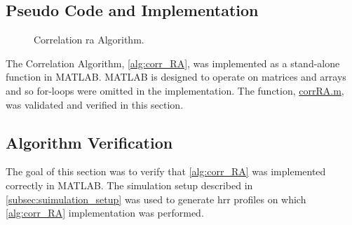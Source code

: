 \documentclass[class=report,11pt,crop=false]{standalone}
\begin{document}
    \subsection{Pseudo Code and Implementation}
    \begin{figure}[ht]
      \vspace{0.5cm}
      \centering
      \captionsetup{type=figure}
      \begin{minipage}{.7\linewidth}
        \begin{algorithm}[h]
            \caption{Correlation \gls{ra} Algorithm.\label{alg:corr_RA}}
            
            \LinesNumbered %
            \DontPrintSemicolon
            \SetAlgoLined
    
            
            \BlankLine
          \vspace{0.5cm}
        \end{algorithm}
      \end{minipage}
    \end{figure}

    The Correlation Algorithm, \autoref{alg:corr_RA}, was implemented as a stand-alone function in \textsc{MATLAB}. \textsc{MATLAB} is designed to operate on matrices and arrays and so for-loops were omitted in the implementation. The function, \href{}{corrRA.m}, was validated and verified in this section.
    
    \subsection{Algorithm Verification}
    The goal of this section was to verify that \autoref{alg:corr_RA} was implemented correctly in \textsc{MATLAB}. The simulation setup described in \autoref{subsec:suimulation_setup} was used to generate \gls{hrr} profiles on which \autoref{alg:corr_RA} implementation was performed.
    
\end{document}
